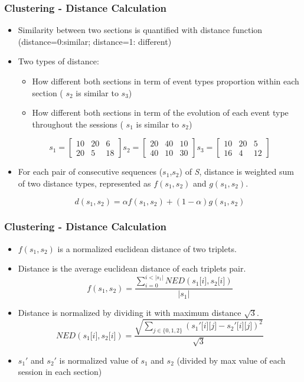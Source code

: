 \documentclass{beamer}
\begin{document}
\begin{frame}
\frametitle{Clustering - Distance Calculation}
\begin{itemize}
\item Similarity between two sections is quantified with distance function (distance=0:similar; distance=1: different)
\item Two types of distance: 
\begin{itemize}
\item How different both sections in term of event types proportion within each section ( $s_2$ is similar to $s_3$)
\item How different both sections in term of the evolution of each event type throughout the sessions ( $s_1$ is similar to $s_2$)
\end{itemize}
\[
\textit{s}_1 = \begin{bmatrix}
  10 & 20 & 6\\
  20 & 5 & 18
\end{bmatrix}
\textit{s}_2 = \begin{bmatrix}
  20 & 40 & 10\\ 
  40 & 10 & 30
\end{bmatrix}
\textit{s}_3 = \begin{bmatrix}
  10 & 20 & 5\\
  16 & 4 & 12 
\end{bmatrix}
\]
\item For each pair of consecutive sequences ($\textit{s}_1$,$\textit{s}_2$) of \textit{S}, distance is weighted sum of two distance types, represented as $\textit{f}(\textit{s}_1,\textit{s}_2)$ and $\textit{g}(\textit{s}_1,\textit{s}_2)$.

$$d(\textit{s}_1,\textit{s}_2) = \alpha\textit{f}(\textit{s}_1,\textit{s}_2) + (1 - \alpha)\textit{g}(\textit{s}_1,\textit{s}_2)$$
\end{itemize}


\end{frame}
\begin{frame}
\frametitle{Clustering - Distance Calculation}
\begin{itemize}


\item $f(\textit{s}_1,\textit{s}_2)$ is a normalized euclidean distance of two triplets.
\item Distance is the average euclidean distance of each triplets pair. 
$$f(\textit{s}_1,\textit{s}_2) = \frac{\displaystyle\sum_{i=0}^{i < \lvert\textit{s}_1\lvert} \textit{N}ED(\textit{s}_1\lbrack i \rbrack,\textit{s}_2\lbrack i \rbrack)}{ \lvert\textit{s}_1\lvert}$$
\item Distance is normalized by dividing it with maximum distance $\sqrt{3}$.
$$ \textit{N}ED(\textit{s}_1\lbrack i \rbrack,\textit{s}_2\lbrack i \rbrack) = \frac{\sqrt{\displaystyle\sum_{j \in \{0,1,2\}}(\textit{s}_1'\lbrack i \rbrack\lbrack j \rbrack - \textit{s}_2'\lbrack i \rbrack\lbrack j \rbrack)^2}}{\sqrt{3}}$$
\item $\textit{s}_1'$ and $\textit{s}_2'$ is normalized value of $\textit{s}_1$ and $\textit{s}_2$ (divided by max value of each session in each section)

\end{itemize}
\end{frame}
\end{document}
